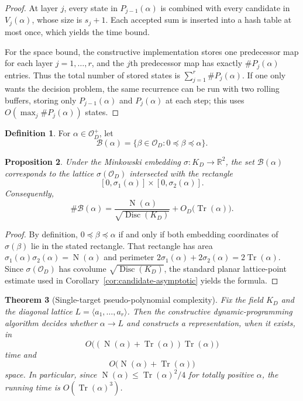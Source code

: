 \documentclass[manuscript]{acmart}
\theoremstyle{plain}
\newtheorem{theorem}{Theorem}[section]
\newtheorem{proposition}[theorem]{Proposition}
\theoremstyle{definition}
\newtheorem{definition}[theorem]{Definition}
\theoremstyle{nonitalicremark}
\newcommand{\R}{\mathbb{R}}
\newcommand{\OO}{\mathcal{O}}
\newcommand{\OD}{\OO_D}
\newcommand{\Tr}{\operatorname{Tr}}
\newcommand{\N}{\operatorname{N}}
\newcommand{\Disc}{\operatorname{Disc}}
\newcommand{\cB}{\mathcal{B}}
\begin{document}
\begin{proof}
At layer $j$, every state in $P_{j-1}(\alpha)$ is combined with every candidate in $V_j(\alpha)$,
whose size is $s_j+1$. Each accepted sum is inserted into a hash table at most once, which yields
the time bound.

For the space bound, the constructive implementation stores one predecessor map for each layer
$j=1,\dots,r$, and the $j$th predecessor map has exactly $\#P_j(\alpha)$ entries. Thus the total
number of stored states is $\sum_{j=1}^r \#P_j(\alpha)$. If one only wants the decision problem, the
same recurrence can be run with two rolling buffers, storing only $P_{j-1}(\alpha)$ and $P_j(\alpha)$
at each step; this uses $O(\max_j \#P_j(\alpha))$ states.
\end{proof}

\begin{definition}
For $\alpha\in\OD^+$, let
\[
\cB(\alpha)=\{\beta\in\OD : 0\preccurlyeq \beta\preccurlyeq \alpha\}.
\]
\end{definition}

\begin{proposition}\label{prop:single-box-count}
Under the Minkowski embedding $\sigma:K_D\to\R^2$, the set $\cB(\alpha)$ corresponds to the lattice
$\sigma(\OD)$ intersected with the rectangle
\[
[0,\sigma_1(\alpha)]\times[0,\sigma_2(\alpha)].
\]
Consequently,
\[
\#\cB(\alpha)=\frac{\N(\alpha)}{\sqrt{\Disc(K_D)}} + O_D\bigl(\Tr(\alpha)\bigr).
\]
\end{proposition}

\begin{proof}
By definition, $0\preccurlyeq \beta\preccurlyeq \alpha$ if and only if both embedding coordinates of
$\sigma(\beta)$ lie in the stated rectangle. That rectangle has area
$\sigma_1(\alpha)\sigma_2(\alpha)=\N(\alpha)$ and perimeter
$2\sigma_1(\alpha)+2\sigma_2(\alpha)=2\Tr(\alpha)$. Since $\sigma(\OD)$ has covolume
$\sqrt{\Disc(K_D)}$, the standard planar lattice-point estimate used in
Corollary~\ref{cor:candidate-asymptotic} yields the formula.
\end{proof}

\begin{theorem}[Single-target pseudo-polynomial complexity]\label{thm:single-pseudopoly}
Fix the field $K_D$ and the diagonal lattice $L=\langle a_1,\dots,a_r\rangle$. Then the constructive
dynamic-programming algorithm decides whether $\alpha\to L$ and constructs a representation, when it
exists, in
\[
O\bigl((\N(\alpha)+\Tr(\alpha))\Tr(\alpha)\bigr)
\]
time and
\[
O\bigl(\N(\alpha)+\Tr(\alpha)\bigr)
\]
space. In particular, since $\N(\alpha)\le \Tr(\alpha)^2/4$ for totally positive $\alpha$, the
running time is $O(\Tr(\alpha)^3)$.
\end{theorem}
\end{document}
